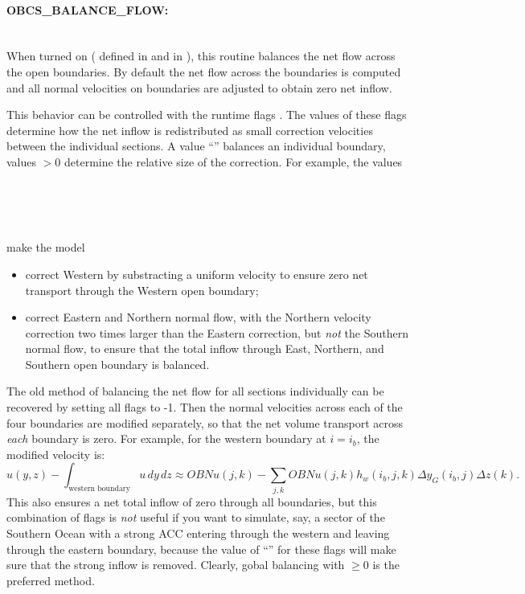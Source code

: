 \paragraph{OBCS\_BALANCE\_FLOW:} ~ \\
%
When turned on (
defined in  and  in
), this routine balances the net flow
across the open boundaries. By default the net flow across the
boundaries is computed and all normal velocities on boundaries are
adjusted to obtain zero net inflow.

This behavior can be controlled with the runtime flags
. The values of these flags determine
how the net inflow is redistributed as small correction velocities
between the individual sections. A value ``'' balances an
individual boundary, values $>0$ determine the relative size of the
correction. For example, the values
\begin{tabbing}
  \\
  \\
  \\
\end{tabbing}
make the model
\begin{itemize}
\item correct Western  by substracting a uniform velocity to
ensure zero net transport through the Western open boundary;
\item correct Eastern and Northern normal flow, with the Northern
  velocity correction two times larger than the Eastern correction, but
  \emph{not} the Southern normal flow, to ensure that the total inflow through
  East, Northern, and Southern open boundary is balanced.
\end{itemize}

The old method of balancing the net flow for all sections individually
can be recovered by setting all flags to -1. Then the normal
velocities across each of the four boundaries are modified separately,
so that the net volume transport across \emph{each} boundary is
zero. For example, for the western boundary at $i=i_{b}$, the modified
velocity is:
\[
u(y,z) - \int_{\mbox{western boundary}}u\,dy\,dz \approx OBNu(j,k) - \sum_{j,k}
OBNu(j,k) h_{w}(i_{b},j,k)\Delta{y_G(i_{b},j)}\Delta{z(k)}.
\]
This also ensures a net total inflow of zero through all boundaries,
but this combination of flags is \emph{not} useful if you want to
simulate, say, a sector of the Southern Ocean with a strong ACC
entering through the western and leaving through the eastern boundary,
because the value of ``'' for these flags will make sure that
the strong inflow is removed. Clearly, gobal balancing with
 $\ge0$ is the preferred method.

